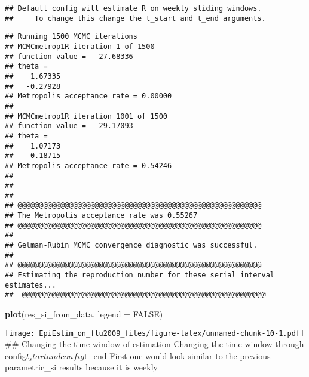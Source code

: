 \documentclass[
]{article}
\newenvironment{Shaded}{\begin{snugshade}}{\end{snugshade}}
\newcommand{\AttributeTok}[1]{\textcolor[rgb]{0.13,0.29,0.53}{#1}}
\newcommand{\ConstantTok}[1]{\textcolor[rgb]{0.56,0.35,0.01}{#1}}
\newcommand{\FunctionTok}[1]{\textcolor[rgb]{0.13,0.29,0.53}{\textbf{#1}}}
\newcommand{\NormalTok}[1]{#1}
\begin{document}
\begin{verbatim}
## Default config will estimate R on weekly sliding windows.
##     To change this change the t_start and t_end arguments.
\end{verbatim}

\begin{verbatim}
## Running 1500 MCMC iterations 
## MCMCmetrop1R iteration 1 of 1500 
## function value =  -27.68336
## theta = 
##    1.67335
##   -0.27928
## Metropolis acceptance rate = 0.00000
## 
## MCMCmetrop1R iteration 1001 of 1500 
## function value =  -29.17093
## theta = 
##    1.07173
##    0.18715
## Metropolis acceptance rate = 0.54246
## 
## 
## 
## @@@@@@@@@@@@@@@@@@@@@@@@@@@@@@@@@@@@@@@@@@@@@@@@@@@@@@@@@
## The Metropolis acceptance rate was 0.55267
## @@@@@@@@@@@@@@@@@@@@@@@@@@@@@@@@@@@@@@@@@@@@@@@@@@@@@@@@@
## 
## Gelman-Rubin MCMC convergence diagnostic was successful.
## 
## @@@@@@@@@@@@@@@@@@@@@@@@@@@@@@@@@@@@@@@@@@@@@@@@@@@@@@@@@ 
## Estimating the reproduction number for these serial interval estimates...
##  @@@@@@@@@@@@@@@@@@@@@@@@@@@@@@@@@@@@@@@@@@@@@@@@@@@@@@@@@
\end{verbatim}

\begin{Shaded}
\begin{Highlighting}[]
\FunctionTok{plot}\NormalTok{(res\_si\_from\_data, }\AttributeTok{legend =} \ConstantTok{FALSE}\NormalTok{)}
\end{Highlighting}
\end{Shaded}

\texttt{[image: EpiEstim\_on\_flu2009\_files/figure-latex/unnamed-chunk-10-1.pdf]}
\#\# Changing the time window of estimation Changing the time window
through config\(t_start and config\)t\_end First one would look similar
to the previous parametric\_si results because it is weekly
\end{document}
